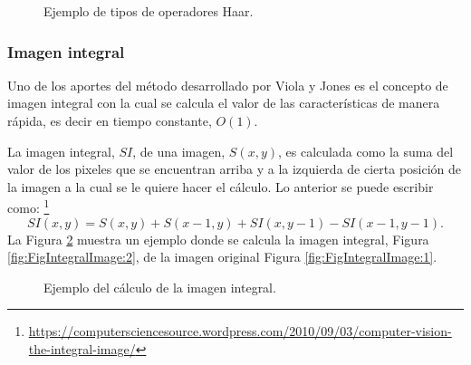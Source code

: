 \begin{figure}[h!]
\caption{Ejemplo de tipos de operadores Haar.} \label{fig:haarFeatures}
\end{figure}


\subsubsection{Imagen integral}\label{sssec:IntegralImage} 

Uno de los aportes del método desarrollado por Viola y Jones es el concepto de imagen integral con la cual se calcula el valor de las características de manera rápida, es decir en tiempo constante, $O(1)$.  

La imagen integral, $SI$, de una imagen, $S(x,y)$, es calculada como la suma del valor de los pixeles que se encuentran arriba y a la izquierda de cierta posición de la imagen a la cual se le quiere hacer el cálculo. Lo anterior se puede escribir como: \footnote{\url{https://computersciencesource.wordpress.com/2010/09/03/computer-vision-the-integral-image/}}   
\begin{equation}
SI(x,y)=S(x,y) + S(x-1,y) + SI(x,y-1)-SI(x-1,y-1).
\end{equation}   
La Figura \ref{fig:FigIntegralImage} muestra un  ejemplo donde se calcula la imagen integral, Figura \ref{fig:FigIntegralImage:2}, de la imagen original Figura \ref{fig:FigIntegralImage:1}.
\begin{figure}[h!]
\centering
{} \qquad
{}
\caption{Ejemplo del cálculo de la imagen integral.} 
\label{fig:FigIntegralImage}
\end{figure}

